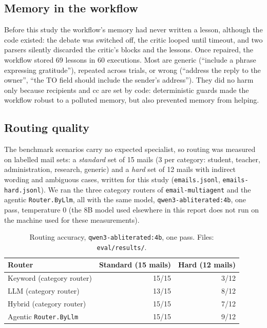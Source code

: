 \documentclass[11pt,a4paper]{article}
\newcommand{\code}[1]{\texttt{#1}}
\begin{document}
\subsection{Memory in the workflow}
\label{sec:wfmem}
Before this study the workflow's memory had never written a lesson, although the code existed: the debate was
switched off, the critic looped until timeout, and two parsers silently discarded the critic's blocks and the
lessons. Once repaired, the workflow stored 69 lessons in 60 executions. Most are generic (``include a phrase
expressing gratitude''), repeated across trials, or wrong (``address the reply to the owner'', ``the TO field should
include the sender's address''). They did no harm only because recipients and cc are set by code: deterministic
guards made the workflow robust to a polluted memory, but also prevented memory from helping.

\subsection{Routing quality}
\label{sec:routing}
The benchmark scenarios carry no expected specialist, so routing was measured on labelled mail sets: a \emph{standard} set
of 15 mails (3 per category: student, teacher, administration, research, generic) and a \emph{hard} set of 12 mails with
indirect wording and ambiguous cases, written for this study (\code{emails.jsonl}, \code{emails-hard.jsonl}). We ran the
three category routers of \code{email-multiagent} and the agentic \code{Router.ByLlm}, all with the same model,
\code{qwen3-abliterated:4b}, one pass, temperature 0 (the 8B model used elsewhere in this report does not run on the
machine used for these measurements).

\begin{table}[ht]
\centering
\begin{tabular}{lrr}
\toprule
Router & Standard (15 mails) & Hard (12 mails) \\
\midrule
Keyword (category router) & 15/15 & 3/12 \\
LLM (category router) & 13/15 & 8/12 \\
Hybrid (category router) & 15/15 & 7/12 \\
Agentic \code{Router.ByLlm} & 15/15 & 9/12 \\
\bottomrule
\end{tabular}
\caption{Routing accuracy, \code{qwen3-abliterated:4b}, one pass. Files: \code{eval/results/}.}
\label{tab:routing}
\end{table}
\end{document}
